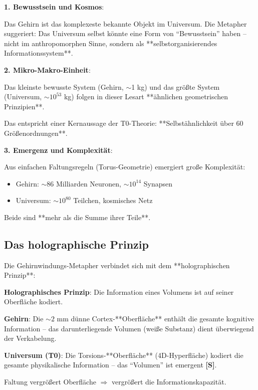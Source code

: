 	\begin{philosophical}
		\textbf{1. Bewusstsein und Kosmos}:

		Das Gehirn ist das komplexeste bekannte Objekt im Universum. Die Metapher suggeriert: Das Universum selbst könnte eine Form von \enquote{Bewusstsein} haben -- nicht im anthropomorphen Sinne, sondern als **selbstorganisierendes Informationssystem**.

		\vspace{0.3cm}

		\textbf{2. Mikro-Makro-Einheit}:

		Das kleinste bewusste System (Gehirn, $\sim$1 kg) und das größte System (Universum, $\sim 10^{53}$ kg) folgen in dieser Lesart **ähnlichen geometrischen Prinzipien**.

		Das entspricht einer Kernaussage der T0-Theorie: **Selbstähnlichkeit über 60 Größenordnungen**.

		\vspace{0.3cm}

		\textbf{3. Emergenz und Komplexität}:

		Aus einfachen Faltungsregeln (Torus-Geometrie) emergiert große Komplexität:
		\begin{itemize}
			\item Gehirn: $\sim 86$ Milliarden Neuronen, $\sim 10^{14}$ Synapsen
			\item Universum: $\sim 10^{80}$ Teilchen, kosmisches Netz
		\end{itemize}

		Beide sind **mehr als die Summe ihrer Teile**.
	\end{philosophical}

	\subsection{Das holographische Prinzip}

	Die Gehirnwindungs-Metapher verbindet sich mit dem **holographischen Prinzip**:

	\begin{keyresult}[Holographie]
		\textbf{Holographisches Prinzip}: Die Information eines Volumens ist auf seiner Oberfläche kodiert.

		\vspace{0.3cm}

		\textbf{Gehirn}: Die $\sim 2$ mm dünne Cortex-**Oberfläche** enthält die gesamte kognitive Information -- das darunterliegende Volumen (weiße Substanz) dient überwiegend der Verkabelung.

		\vspace{0.3cm}

		\textbf{Universum (T0)}: Die Torsions-**Oberfläche** (4D-Hyperfläche) kodiert die gesamte physikalische Information -- das \enquote{Volumen} ist emergent \textbf{[S]}.

		\vspace{0.3cm}

		Faltung vergrößert Oberfläche $\Rightarrow$ vergrößert die Informationskapazität.
	\end{keyresult}

